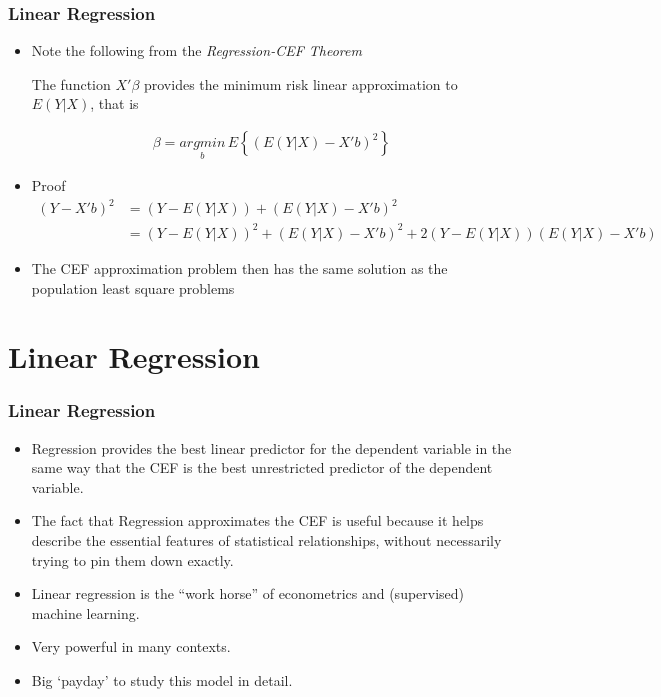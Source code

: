 \documentclass[
  shownotes,
  xcolor={svgnames},
  hyperref={colorlinks,citecolor=DarkBlue,linkcolor=DarkRed,urlcolor=DarkBlue}
  , aspectratio=169]{beamer}
\begin{document}
\begin{frame}
\frametitle{Linear Regression}

\begin{itemize}
\item Note the following from the {\it Regression-CEF Theorem}

The function $X'\beta$ provides the minimum risk  linear approximation to $E(Y|X)$, that is

\begin{align}
\beta = \underset{b}{argmin}\,E\left\{ (E(Y|X) - X'b)^2 \right\}
\end{align}

\item Proof 
\begin{align}
(Y - X'b)^2 &= {(Y- E(Y|X))+ (E(Y|X) - X'b)}^2 \\
            &= (Y- E(Y|X))^2+ (E(Y|X) - X'b)^2 + 2 (Y- E(Y|X))(E(Y|X) - X'b)
\end{align}

\item The CEF approximation problem then has the same solution as the population least square problems


\end{itemize}
\end{frame}

\section{Linear Regression}
\begin{frame}
\frametitle{Linear Regression}

\begin{itemize}


  \item Regression provides the best linear predictor for the dependent variable in the same way that the CEF is the best unrestricted predictor of the dependent variable. 
  \medskip
  

  \item The fact that Regression approximates the CEF is useful because it helps describe the essential features of statistical relationships, without necessarily trying to pin them down exactly. 
  \medskip

  \item Linear regression is the “work horse” of econometrics and (supervised) machine learning. 
  \medskip
  \item Very powerful in many contexts.
  \medskip
  \item Big `payday' to study this model in detail.
\end{itemize}
\end{frame}
\end{document}
